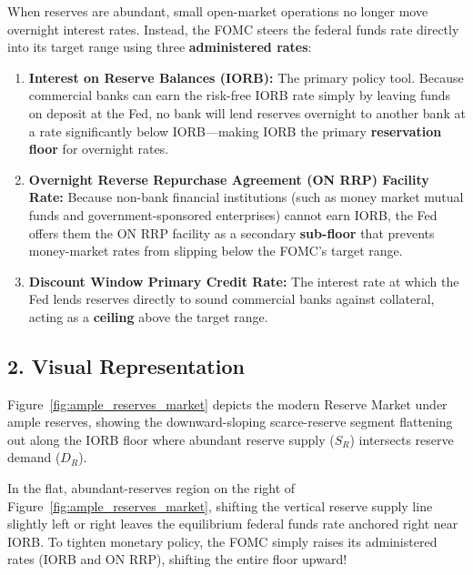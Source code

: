 \documentclass[11pt,letterpaper]{article}
\begin{document}
When reserves are abundant, small open-market operations no longer move overnight interest rates. Instead, the FOMC steers the federal funds rate directly into its target range using three \textbf{administered rates}:
\begin{enumerate}
    \item \textbf{Interest on Reserve Balances (IORB):} The primary policy tool. Because commercial banks can earn the risk-free IORB rate simply by leaving funds on deposit at the Fed, no bank will lend reserves overnight to another bank at a rate significantly below IORB—making IORB the primary \textbf{reservation floor} for overnight rates.
    \item \textbf{Overnight Reverse Repurchase Agreement (ON RRP) Facility Rate:} Because non-bank financial institutions (such as money market mutual funds and government-sponsored enterprises) cannot earn IORB, the Fed offers them the ON RRP facility as a secondary \textbf{sub-floor} that prevents money-market rates from slipping below the FOMC's target range.
    \item \textbf{Discount Window Primary Credit Rate:} The interest rate at which the Fed lends reserves directly to sound commercial banks against collateral, acting as a \textbf{ceiling} above the target range.
\end{enumerate}

\subsection*{2. Visual Representation}
Figure~\ref{fig:ample_reserves_market} depicts the modern Reserve Market under ample reserves, showing the downward-sloping scarce-reserve segment flattening out along the IORB floor where abundant reserve supply ($S_R$) intersects reserve demand ($D_R$).

\begin{tcolorbox}[colback=yellow!10!white,colframe=orange!80!black,title=\textbf{Clear It Up: Why Open-Market Operations Do Not Move Rates Under Ample Reserves}]
In the flat, abundant-reserves region on the right of Figure~\ref{fig:ample_reserves_market}, shifting the vertical reserve supply line slightly left or right leaves the equilibrium federal funds rate anchored right near IORB. To tighten monetary policy, the FOMC simply raises its administered rates (IORB and ON RRP), shifting the entire floor upward!
\end{tcolorbox}
\end{document}
